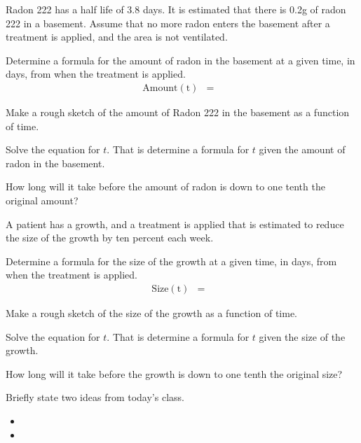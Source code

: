 \begin{problem}
\item Radon 222 has a half life of 3.8 days. It is estimated that
  there is 0.2g of radon 222 in a basement. Assume that no more
  radon enters the basement after a treatment is applied, and the area
  is not ventilated.
  \begin{subproblem}
    \item Determine a formula for the amount of radon in the basement
      at a given time, in days, from when the treatment is applied.
      \begin{eqnarray*}
        \mathrm{Amount(t)} & = & 
      \end{eqnarray*}
    \item Make a rough sketch of the amount of Radon 222 in the
      basement as a function of time.  
      \vfill
    \item Solve the equation for $t$. That is determine a formula for
      $t$ given the amount of radon in the basement.
      \vfill
    \item How long will it take before the amount of radon is down to
      one tenth the original amount?
      \vfill
  \end{subproblem}

\clearpage

\item A patient has a growth, and a treatment is applied that is
  estimated to reduce the size of the growth by ten percent each
  week. 
  \begin{subproblem}
  \item Determine a formula for the size of the growth at a given
    time, in days, from when the treatment is applied.
      \begin{eqnarray*}
        \mathrm{Size(t)} & = & 
      \end{eqnarray*}
    \item Make a rough sketch of the size of the growth as a function of time.  
      \vfill
    \item Solve the equation for $t$. That is determine a formula for
      $t$ given the size of the growth.
      \vfill
    \item How long will it take before the growth is down to
      one tenth the original size?
      \vfill
  \end{subproblem}


\end{problem}


\postClass

\begin{problem}
\item Briefly state two ideas from today's class.
  \begin{itemize}
  \item 
  \item 
  \end{itemize}
\item 
  \begin{subproblem}
    \item
  \end{subproblem}
\end{problem}



